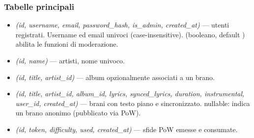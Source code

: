 \subsubsection{Tabelle principali}
\begin{itemize}
    \item {} \emph{(id, username, email, password\_hash, is\_admin, created\_at)} ---
    utenti registrati. Username ed email univoci (case-insensitive).
     (booleano, default ) abilita le funzioni
    di moderazione.
    \item {} \emph{(id, name)} --- artisti, nome univoco.
    \item {} \emph{(id, title, artist\_id)} ---
    album opzionalmente associati a un brano.
    \item {} \emph{(id, title, artist\_id, album\_id, lyrics,
    synced\_lyrics, duration, instrumental, user\_id, created\_at)} ---
    brani con testo piano e sincronizzato.  nullable: 
    indica un brano anonimo (pubblicato via PoW).
    \item {} \emph{(id, token, difficulty, used, created\_at)} ---
    sfide PoW emesse e consumate.
\end{itemize}
